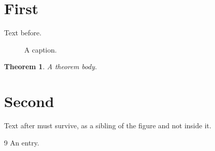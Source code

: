 \documentclass{article}
\newtheorem{thmx}{Theorem}
\begin{document}
\section{First}
Text before.

\begin{figure}
  \caption{A caption.}
\end{figure}

\begin{thmx}
  A theorem body.
\end{thmx}

\section{Second}
Text after must survive, as a sibling of the figure and not inside it.

\begin{thebibliography}{9}
 An entry.
\end{thebibliography}
\end{document}
